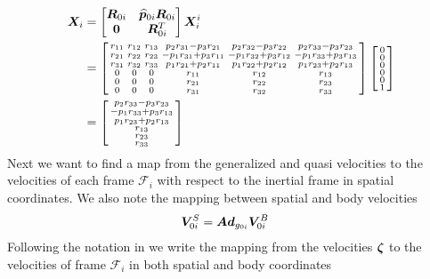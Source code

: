 \begin{align}
	\boldsymbol X_i&=\begin{bmatrix}\boldsymbol R_{0i} & \widehat{\boldsymbol p}_{0i} \boldsymbol R_{0i} \\ \boldsymbol 0 & \boldsymbol R_{0i}^T \end{bmatrix}\boldsymbol X_i^i
	\label{eq:adjoint_calc}
	\\
	&= \left[\begin{smallmatrix}{}r_{11} & r_{12} & r_{13} & p_{2} r_{31} - p_{3} r_{21} & p_{2} r_{32} - p_{3} r_{22} & p_{2} r_{33} - p_{3} r_{23}\\r_{21} & r_{22} & r_{23} & - p_{1} r_{31} + p_{3} r_{11} & - p_{1} r_{32} + p_{3} r_{12} & - p_{1} r_{33} + p_{3} r_{13}\\r_{31} & r_{32} & r_{33} & p_{1} r_{21} + p_{2} r_{11} & p_{1} r_{22} + p_{2} r_{12} & p_{1} r_{23} + p_{2} r_{13}\\0 & 0 & 0 & r_{11} & r_{12} & r_{13}\\0 & 0 & 0 & r_{21} & r_{22} & r_{23}\\0 & 0 & 0 & r_{31} & r_{32} & r_{33}\end{smallmatrix}\right]
	\left[  \begin{smallmatrix}0\\0\\0\\0\\0\\1 \end{smallmatrix}  \right]
	\\
	&=\left[\begin{smallmatrix}{}p_{2} r_{33} - p_{3} r_{23}\\- p_{1} r_{33} + p_{3} r_{13}\\p_{1} r_{23} + p_{2} r_{13}\\r_{13}\\r_{23}\\r_{33}\end{smallmatrix}\right]
\end{align}
Next we want to find a map from the generalized and quasi velocities to the velocities of each frame $\mathcal{F}_i$ with respect to the inertial frame  in spatial coordinates. We also note the mapping between spatial and body velocities
\begin{align}
	\boldsymbol V_{0i}^S &=  \boldsymbol{Ad}_{g_{0i}} \boldsymbol V_{0i}^B  
  \label{eq:adg0b1}
 \end{align}
Following the notation in \cite{kristin_jant} we write the mapping from the velocities $\boldsymbol \zeta$ to the velocities of frame $\mathcal{F}_i$ in both spatial and body coordinates
